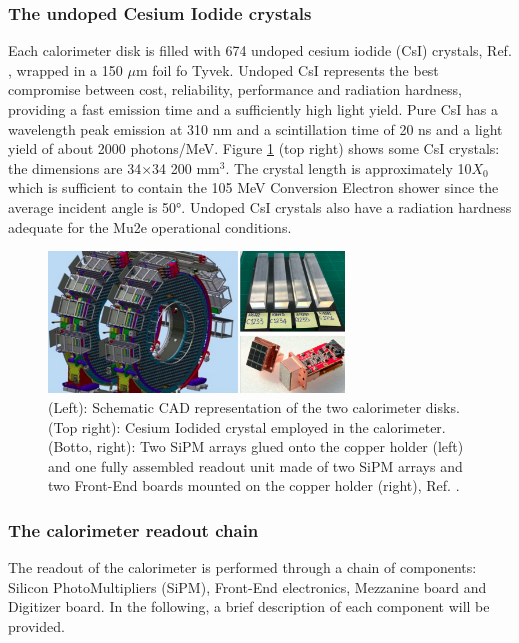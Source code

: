\subsubsection{The undoped Cesium Iodide crystals}
Each calorimeter disk is filled with 674 undoped cesium 
iodide (CsI) crystals, Ref. \cite{em6}, wrapped in a 150 $\mu$m foil fo Tyvek. 
Undoped CsI represents the best compromise between cost, 
reliability, performance and radiation hardness, providing 
a fast emission time and a sufficiently high light yield. Pure 
CsI has a wavelength peak emission at 310 nm and a scintillation 
time of 20 ns and a light yield of about 2000 photons/MeV. 
Figure \ref{fig:calo2} (top right) shows some CsI crystals: 
the dimensions are 34$\times$34 200 mm$^3$. The crystal length 
is approximately 10$X_0$ which is sufficient to contain the 105 
MeV Conversion Electron shower since the average incident angle 
is 50°. Undoped CsI crystals also have a radiation hardness 
adequate for the Mu2e operational conditions. 




\begin{figure}[!h]
    \centering
    \includegraphics[width =0.7\textwidth]{figures/png/Screenshot_20240322_121000.png}
    \caption[The calorimeter components.]{(Left): Schematic CAD representation of the two calorimeter disks. (Top right): 
    Cesium Iodided crystal employed in the calorimeter. (Botto, right): Two SiPM arrays 
    glued onto the copper holder (left) and one fully assembled readout unit made of two 
    SiPM arrays and two Front-End boards mounted on the copper holder (right), Ref. \cite{em4}.}
    \label{fig:calo2}
\end{figure}


\subsubsection{The calorimeter readout chain}
The readout of the calorimeter is performed through a chain of components: Silicon PhotoMultipliers (SiPM), 
Front-End electronics, Mezzanine board and Digitizer board. In the following, 
a brief description of each component will be provided.
